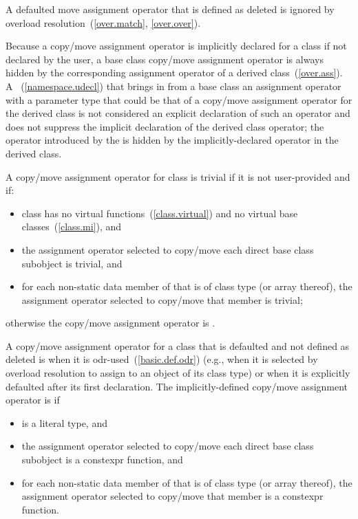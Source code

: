 A defaulted move assignment operator that is defined as deleted is ignored by
overload resolution~(\ref{over.match}, \ref{over.over}).

\pnum
{}%
%
Because a copy/move assignment operator is implicitly declared for a class
if not declared by the user,
a base class copy/move assignment operator is always hidden
by the corresponding assignment operator of a derived class~(\ref{over.ass}).
A
~(\ref{namespace.udecl}) that brings in from a base class an assignment operator
with a parameter type that could be that of a
copy/move assignment operator for the
derived class is not considered an explicit declaration of such an
operator and does not suppress the implicit declaration of the derived class
operator;
the operator introduced by the
is hidden by the implicitly-declared operator in the derived
class.

\pnum
{}%
%
A copy/move assignment operator for class
is
trivial
if it is not user-provided and if:

\begin{itemize}
\item
class
has no virtual functions~(\ref{class.virtual})
and no virtual base classes~(\ref{class.mi}), and

\item the assignment operator selected to copy/move each direct
base class subobject is trivial, and

\item
for each non-static data member of
that is of class type (or array thereof),
the assignment operator selected to copy/move that member is trivial;
\end{itemize}

otherwise the copy/move assignment operator is
.

\pnum
{}%
%
A copy/move assignment operator for a class 
that is defaulted and not defined as deleted
is
when
it is odr-used~(\ref{basic.def.odr}) (e.g., when it is selected by overload resolution
to assign to an object of its class type)
or when it is explicitly defaulted after its first declaration.
The implicitly-defined copy/move assignment operator is  if
\begin{itemize}
\item
{} is a literal type, and

\item
the assignment operator selected to copy/move each direct base class subobject
is a constexpr function, and

\item
for each non-static data member of  that is of class type (or array
thereof), the assignment operator selected to copy/move that member is a
constexpr function.
\end{itemize}


